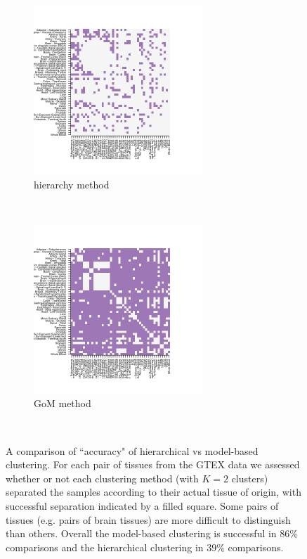   \begin{figure}[ht]
    \centering
    \begin{subfigure}[t]{0.5\textwidth}
        \centering
        \includegraphics[height=2.5in]{../plots/hierarchy_F_thin_0_1.png}
        \caption{hierarchy method}
    \end{subfigure}%
    ~ 
    \begin{subfigure}[t]{0.5\textwidth}
        \centering
        \includegraphics[height=2.5in]{../plots/admixture_F_thin_0_1.png}
        \caption{GoM method}
    \end{subfigure} \\
\caption{A comparison of ``accuracy" of hierarchical vs model-based clustering. For each pair of tissues from the GTEX data we assessed whether or not each clustering method (with $K=2$ clusters) separated the samples according to their actual tissue of origin, with successful separation indicated by a filled square. Some pairs of tissues (e.g. pairs of brain tissues) are more difficult to distinguish than others. Overall the model-based clustering is successful in $86 \%$ comparisons and the hierarchical clustering in $39 \%$ comparisons.}
\label{fig:fig2}
\end{figure}


